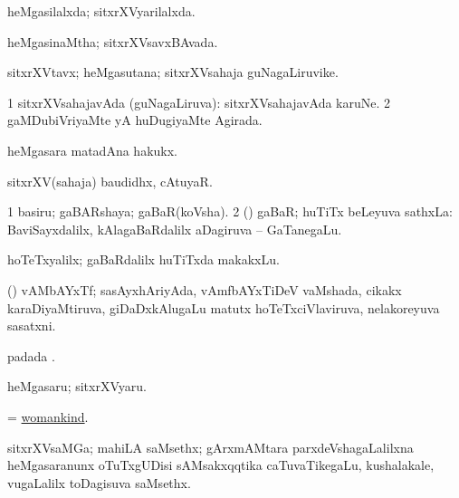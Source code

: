 \bentry
{} 
\gl{\gu}
\expl{}
\bmng
heMgasilalxda; sitxrXVyarilalxda. 
\emng
\eentry

\bentry
{} 
\gl{\gu}
\expl{}
\bmng
heMgasinaMtha; sitxrXVsavxBAvada. 
\emng
\eentry

\bentry
{} 
\gl{\nA}
\expl{}
\bmng
sitxrXVtavx; heMgasutana; sitxrXVsahaja guNagaLiruvike. 
\emng
\eentry

\bentry
{} 
\gl{\gu}
\expl{}
\bmng
\bnum
\num{1} sitxrXVsahajavAda (guNagaLiruva):  sitxrXVsahajavAda karuNe. 
\num{2} gaMDubiVriyaMte yA huDugiyaMte Agirada. 
\enum
\emng
\eentry

\bentry
{} 
\gl{\nA}
\expl{}
\bmng
heMgasara matadAna hakukx. 
\emng
\eentry

\bentry
{} 
\gl{\nA}
\expl{}
\bmng
sitxrXV(sahaja) baudidhx, cAtuyaR. 
\emng
\eentry

\bentry
{} 
\gl{\nA}
\bmng
\bnum
\num{1} basiru; gaBARshaya; gaBaR(koVsha). 
\num{2} (\rUpa) gaBaR; huTiTx beLeyuva sathxLa:  BaviSayxdalilx, kAlagaBaRdalilx aDagiruva -- GaTanegaLu. 
\enum
\emng

\noindent
\gl{\pagu}
\expl{}
\bmng
{} hoTeTxyalilx; gaBaRdalilx huTiTxda makakxLu. 
\emng
\eentry

\bentry
{} 
\gl{\nA}
\expl{}
\bmng
(\AseTxrXV) vAMbAYxTf; sasAyxhAriyAda, vAmfbAYxTiDeV vaMshada, cikakx karaDiyaMtiruva, giDaDxkAlugaLu matutx hoTeTxciVlaviruva, nelakoreyuva sasatxni. 
\emng
\eentry

\bentry
{} 
\gl{\nA}
\expl{}
\bmng
{} padada \bava. 
\emng
\eentry

\bentry
{} 
\gl{\nA}
\expl{}
\bmng
heMgasaru; sitxrXVyaru. 
\emng
\eentry

\bentry
{} 
\gl{\nA}
\expl{}
\bmng
= \hyperlink{womankind}{womankind}. 
\emng
\eentry

\bentry
{} 
\gl{\nA}
\expl{}
\bmng
sitxrXVsaMGa; mahiLA saMsethx; gArxmAMtara parxdeVshagaLalilxna heMgasaranunx oTuTxgUDisi sAMsakxqqtika caTuvaTikegaLu, kushalakale, \mo vugaLalilx toDagisuva saMsethx. 
\emng
\eentry

